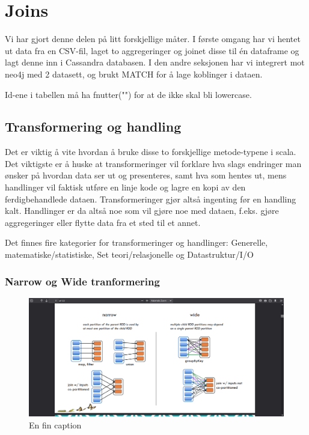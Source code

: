 \section{Joins}
Vi har gjort denne delen på litt forskjellige måter. I første omgang har vi hentet ut data fra en CSV-fil, laget to aggregeringer og joinet disse til én dataframe og lagt denne inn i Cassandra databasen. I den andre seksjonen har vi integrert mot neo4j med 2 datasett, og brukt MATCH for å lage koblinger i dataen.


Id-ene i tabellen må ha fnutter("") for at de ikke skal bli lowercase.



\subsection{Transformering og handling}
Det er viktig å vite hvordan å bruke disse to forskjellige metode-typene i scala. Det viktigste er å huske at transformeringer vil forklare hva slags endringer man ønsker på hvordan data ser ut og presenteres, samt hva som hentes ut, mens handlinger vil faktisk utføre en linje kode og lagre en kopi av den ferdigbehandlede dataen. Transformeringer gjør altså ingenting før en handling kalt. Handlinger er da altså noe som vil gjøre noe med dataen, f.eks. gjøre aggregeringer eller flytte data fra et sted til et annet. 


Det finnes fire kategorier for transformeringer og handlinger:\newline
Generelle, matematiske/statistiske, Set teori/relasjonelle og Datastruktur/I/O


\subsubsection{Narrow og Wide tranformering}

\begin{figure}[H]
    \centering
    \includegraphics[scale=0.3]{images/transformActionPic.png}
    \caption{En fin caption}
  \end{figure}

